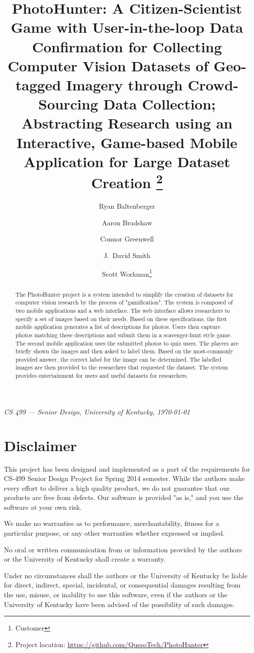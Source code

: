 \documentclass{article}
\title{PhotoHunter: A Citizen-Scientist Game with User-in-the-loop
  Data Confirmation for Collecting Computer Vision Datasets of
  Geo-tagged Imagery through Crowd-Sourcing Data Collection; Abstracting
  Research using an Interactive, Game-based Mobile Application for Large
  Dataset Creation
  \footnote{Project location:
    \url{https://github.com/QuesoTech/PhotoHunter}
  }
}
\author{
	Ryan Baltenberger \and
	Aaron Bradshaw \and
	Connor Greenwell \and
	J.\ David Smith \and
	Scott Workman\footnote{Customer}
}
\date{}
\begin{document}
\maketitle

\begin{center}
  \textit{CS 499 --- Senior Design, University of Kentucky, \today}
\end{center}

\begin{abstract}
  The PhotoHunter project is a system intended to simplify the creation of
  datasets for computer vision research by the process of "gamification". The
  system is composed of two mobile applications and a web interface. The web
  interface allows researchers to specify a set of images based on their needs.
  Based on these specifications, the first mobile application generates a list of
  descriptions for photos. Users then capture photos matching these descriptions
  and submit them in a scavenger-hunt style game. The second mobile application
  uses the submitted photos to quiz users. The players are briefly shown the
  images and then asked to label them. Based on the most-commonly provided
  answer, the correct label for the image can be determined. The labelled images
  are then provided to the researchers that requested the dataset. The system
  provides entertainment for users and useful datasets for researchers.
\end{abstract}

\section{Disclaimer}
This project has been designed and implemented as a part of the requirements
for CS-499 Senior Design Project for Spring 2014 semester.  While the authors
make every effort to deliver a high quality product, we do not guarantee that
our products are free from defects.  Our software is provided "as is," and you
use the software at your own risk.

We make no warranties as to performance, merchantability, fitness for a
particular purpose, or any other warranties whether expressed or implied.

No oral or written communication from or information provided by the authors or
the University of Kentucky shall create a warranty.

Under no circumstances shall the authors or the University of Kentucky be
liable for direct, indirect, special, incidental, or consequential damages
resulting from the use, misuse, or inability to use this software, even if the
authors or the University of Kentucky have been advised of the possibility of
such damages.
\end{document}
